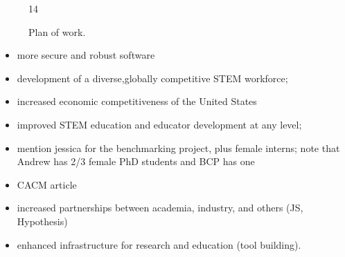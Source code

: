 

\begin{figure}[ht]
  \centering
\begin{ganttchart}[
      expand chart=\textwidth,
      y unit chart=.4cm,
    ]{1}{4}
  
\end{ganttchart}
  \caption{Plan of work.
}\label{fig:workplan}
\end{figure}





\begin{itemize}
\item more secure and robust software
\item development of a diverse,globally competitive STEM workforce;
\item increased economic competitiveness of the United States
\item improved STEM education and educator development at any level;
\item mention jessica for the benchmarking project, plus female
interns; note that Andrew has 2/3 female PhD students and BCP has one
\item CACM article
\item increased partnerships between academia, industry, and others
(JS, Hypothesis)
\item enhanced infrastructure for research and education (tool
building).
\end{itemize}

